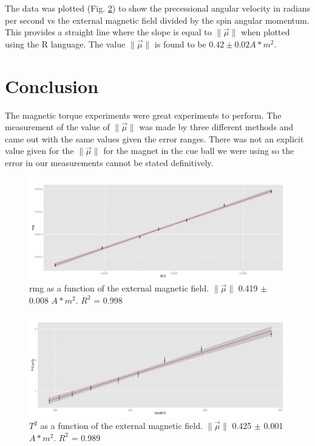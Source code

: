 \documentclass[twocolumn,secnumarabic,amssymb, nobibnotes, aps, pra]{revtex4}
\newcommand{\norm}[1]{\lVert#1\rVert}
\begin{document}
The data was plotted (Fig. \ref{fig:oscillatory}) to show the precessional angular velocity in radians per second vs the external magnetic field divided by the spin angular momentum.  This provides a straight line where the slope is equal to $\norm{\vec{\mu}} $ when plotted using the R language.  The value $\norm{\vec{\mu}} $ is found to be $0.42 \pm 0.02 A*m^2$. 

\section{Conclusion}

The magnetic torque experiments were great experiments to perform.  The measurement of the value of $\norm{\vec{\mu}}$ was made by three different methods and came out with the same values given the error ranges.  There was not an explicit value given for the $\norm{\vec{\mu}}$ for the magnet in the cue ball we were using so the error in our measurements cannot be stated definitively. 


\newpage
\begin{figure} [b]  %
\begin{center}
\includegraphics[scale=.5]{grav.pdf} 
\end{center}
\caption{rmg as a function of the external magnetic field. $\norm{\vec{\mu}}$ 0.419 $\pm$ 0.008 $A * m^2$.  $R^2$ = 0.998}
\label{fig:grav}
\end{figure}


\begin{figure} [b]  %
\begin{center}
\includegraphics[scale=.5]{oscillatory.pdf} 
\end{center}
\caption{$T^2$ as a function of the external magnetic field. $\norm{\vec{\mu}}$ 0.425 $\pm$ 0.001 $A * m^2$.  $R^2$ = 0.989}
\label{fig:oscillatory}
\end{figure}
\end{document}
